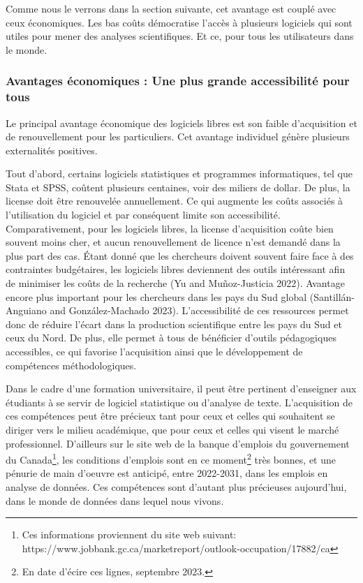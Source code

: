\documentclass[
  letterpaper,
]{scrbook}
\begin{document}
Comme nous le verrons dans la section suivante, cet avantage est couplé
avec ceux économiques. Les bas coûts démocratise l'accès à plusieurs
logiciels qui sont utiles pour mener des analyses scientifiques. Et ce,
pour tous les utilisateurs dans le monde.

\hypertarget{avantages-uxe9conomiques-une-plus-grande-accessibilituxe9-pour-tous}{%
\subsubsection{Avantages économiques : Une plus grande accessibilité
pour
tous}\label{avantages-uxe9conomiques-une-plus-grande-accessibilituxe9-pour-tous}}

Le principal avantage économique des logiciels libres est son faible
d'acquisition et de renouvellement pour les particuliers. Cet avantage
individuel génère plusieurs externalités positives.

Tout d'abord, certains logiciels statistiques et programmes
informatiques, tel que Stata et SPSS, coûtent plusieurs centaines, voir
des miliers de dollar. De plus, la license doit être renouvelée
annuellement. Ce qui augmente les coûts associés à l'utilisation du
logiciel et par conséquent limite son accessibilité. Comparativement,
pour les logiciels libres, la license d'acquisition coûte bien souvent
moins cher, et aucun renouvellement de licence n'est demandé dans la
plus part des cas. Étant donné que les chercheurs doivent souvent faire
face à des contraintes budgétaires, les logiciels libres deviennent des
outils intéressant afin de minimiser les coûts de la recherche (Yu and
Muñoz-Justicia 2022). Avantage encore plus important pour les chercheurs
dans les pays du Sud global (Santillán-Anguiano and González-Machado
2023). L'accessibilité de ces ressources permet donc de réduire l'écart
dans la production scientifique entre les pays du Sud et ceux du Nord.
De plus, elle permet à tous de bénéficier d'outils pédagogiques
accessibles, ce qui favorise l'acquisition ainsi que le développement de
compétences méthodologiques.

Dans le cadre d'une formation universitaire, il peut être pertinent
d'enseigner aux étudiants à se servir de logiciel statistique ou
d'analyse de texte. L'acquisition de ces compétences peut être précieux
tant pour ceux et celles qui souhaitent se diriger vers le milieu
académique, que pour ceux et celles qui visent le marché professionnel.
D'ailleurs sur le site web de la banque d'emplois du gouvernement du
Canada\footnote{Ces informations proviennent du site web suivant:
  https://www.jobbank.gc.ca/marketreport/outlook-occupation/17882/ca},
les conditions d'emplois sont en ce moment\footnote{En date d'écire ces
  lignes, septembre 2023.} très bonnes, et une pénurie de main d'oeuvre
est anticipé, entre 2022-2031, dans les emplois en analyse de données.
Ces compétences sont d'autant plus précieuses aujourd'hui, dans le monde
de données dans lequel nous vivons.
\end{document}
